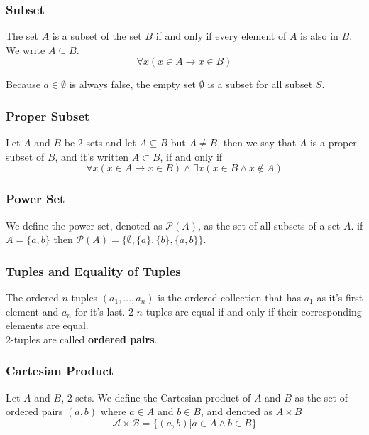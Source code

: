 \documentclass{article}
\begin{document}
\subsubsection{Subset} The set $ A $ is a subset of the set $ B $ if and only if every element of $ A $ is also in $ B $. We write $ A \subseteq B $.
\begin{equation}
\forall x(x \in A \rightarrow x \in B)
\end{equation}

\begin{tcolorbox}[width=12.1cm, leftrule=3mm]
Because $ a \in \emptyset $ is always false, the empty set $ \emptyset $ is a subset for all subset $ S $.
\end{tcolorbox}

\subsubsection{Proper Subset} Let $ A $ and $ B $ be 2 sets and let $ A \subseteq B $ but $ A \neq B $, then we say that $ A $ is a proper subset of $ B $, and it's written $ A \subset B $, if and only if
\begin{equation}
\forall x(x \in A \rightarrow x \in B) \wedge \exists x(x \in B \wedge x \notin A)
\end{equation}
  
\subsubsection{Power Set} We define the power set, denoted as $ \mathcal{P}(A) $, as the set of all subsets of a set $ A $. if $ A = \{a,b\} $ then $ \mathcal{P}(A) = \{\emptyset,\{a\},\{b\},\{a,b\}\} $.

\subsubsection{Tuples and Equality of Tuples} The ordered $ n $-tuples $ (a_1,...,a_n) $ is the ordered collection that has $ a_1 $ as it's first element and $ a_n $ for it's last. 2 $ n $-tuples are equal if and only if their corresponding elements are equal.
\\
2-tuples are called \textbf{ordered pairs}.

\subsubsection{Cartesian Product} Let $ A $ and $ B $, 2 sets. We define the Cartesian product of $ A $ and $ B $ as the set of ordered pairs $ (a,b) $ where $ a \in A $ and $ b \in B $, and denoted as $ A \times B $
\begin{equation}
\mathcal{A} \times \mathcal{B} = \{(a,b) | a \in A \wedge b \in B\}
\end{equation}
\end{document}
